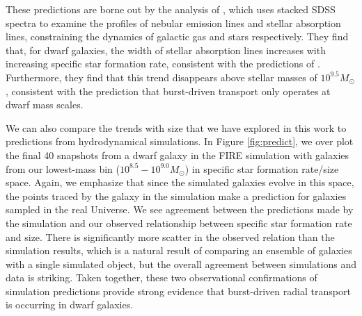\documentclass[iop]{emulateapj}
\begin{document}
These predictions are borne out by the analysis of \cite{Cicone16}, which uses stacked SDSS spectra to examine the profiles of nebular emission lines and stellar absorption lines, constraining the dynamics of galactic gas and stars respectively. They find that, for dwarf galaxies, the width of stellar absorption lines increases with increasing specific star formation rate, consistent with the predictions of \cite{El-Badry17}. Furthermore, they find that this trend disappears above stellar masses of $10^{9.5} M_{\odot}$, consistent with the prediction that burst-driven transport only operates at dwarf mass scales.

We can also compare the trends with size that we have explored in this work to predictions from hydrodynamical simulations. In Figure \ref{fig:predict}, we over plot the final 40 snapshots from a dwarf galaxy in the FIRE simulation with galaxies from our lowest-mass bin ($10^{8.5}-10^{9.0} M_{\odot}$) in specific star formation rate/size space. Again, we emphasize that since the simulated galaxies evolve in this space, the points traced by the galaxy in the simulation make a prediction for galaxies sampled in the real Universe. We see agreement between the predictions made by the simulation and our observed relationship between specific star formation rate and size. There is significantly more scatter in the observed relation than the simulation results, which is a natural result of comparing an ensemble of galaxies with a single simulated object, but the overall agreement between simulations and data is striking. Taken together, these two observational confirmations of simulation predictions provide strong evidence that burst-driven radial transport is occurring in dwarf galaxies.
\end{document}
